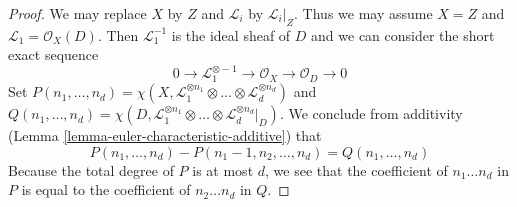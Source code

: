 \begin{proof}
We may replace $X$ by $Z$ and $\mathcal{L}_i$ by $\mathcal{L}_i|_Z$.
Thus we may assume $X = Z$ and $\mathcal{L}_1 = \mathcal{O}_X(D)$.
Then $\mathcal{L}_1^{-1}$ is the ideal sheaf of $D$ and we can
consider the short exact sequence
$$
0 \to \mathcal{L}_1^{\otimes -1} \to \mathcal{O}_X \to \mathcal{O}_D \to 0
$$
Set
$P(n_1, \ldots, n_d) =
\chi(X, \mathcal{L}_1^{\otimes n_1} \otimes \ldots \otimes
\mathcal{L}_d^{\otimes n_d})$
and
$Q(n_1, \ldots, n_d) =
\chi(D, \mathcal{L}_1^{\otimes n_1} \otimes \ldots \otimes
\mathcal{L}_d^{\otimes n_d}|_D)$.
We conclude from additivity
(Lemma \ref{lemma-euler-characteristic-additive})
that
$$
P(n_1, \ldots, n_d) - P(n_1 - 1, n_2, \ldots, n_d) =
Q(n_1, \ldots, n_d)
$$
Because the total degree of $P$ is at most $d$, we see that
the coefficient of $n_1 \ldots n_d$ in $P$ is equal to the coefficient
of $n_2 \ldots n_d$ in $Q$.
\end{proof}















